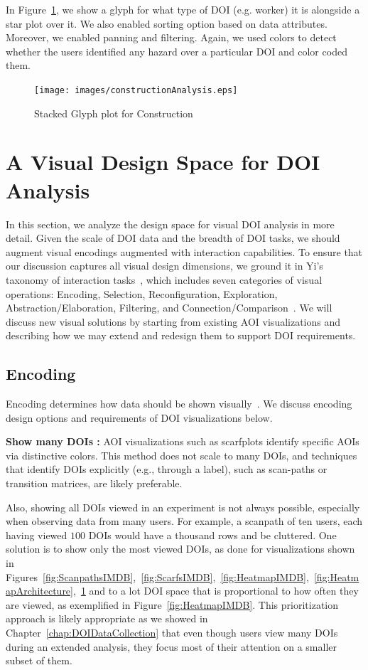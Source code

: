 In Figure~\ref{fig:constructionAnalysis}, we show a glyph for what type of DOI (e.g. worker) it is alongside a star plot over it. We also enabled sorting option based on data attributes. Moreover, we enabled panning and filtering. Again, we used colors to detect whether the users identified any hazard over a particular DOI and color coded them. 

\begin{figure}
  \centering
  \texttt{[image: images/constructionAnalysis.eps]}
  \caption{Stacked Glyph plot for Construction}
	\label{fig:constructionAnalysis}
\end{figure}

\section{A Visual Design Space for DOI Analysis}

In this section, we analyze the design space for visual DOI analysis in more detail. Given the scale of DOI data and the breadth of DOI tasks, we should augment visual encodings augmented with interaction capabilities. To ensure that our discussion captures all visual design dimensions, we ground it in Yi's taxonomy of interaction tasks~\cite{Yi07}, which includes seven categories of visual operations: Encoding, Selection, Reconfiguration, Exploration, Abstraction/Elaboration, Filtering, and Connection/Comparison~\cite{Yi07}. We will discuss new visual solutions by starting from existing AOI visualizations and describing how we may extend and redesign them to support DOI requirements. 

\subsection{Encoding}
\label{sec:Encoding}
Encoding determines how data should be shown visually~\cite{Yi07}. We discuss encoding design options and requirements of DOI visualizations below.

\textbf{Show many DOIs :} AOI visualizations such as scarfplots identify specific AOIs via distinctive colors. This method does not scale to many DOIs, and techniques that identify DOIs explicitly (e.g., through a label), such as scan-paths or transition matrices, are likely preferable. 

Also, showing all DOIs viewed in an experiment is not always possible, especially when observing data from many users. For example, a scanpath of ten users, each having viewed $100$ DOIs would have a thousand rows and be cluttered. One solution is to show only the most viewed DOIs, as done for visualizations shown in Figures~\ref{fig:ScanpathsIMDB},~\ref{fig:ScarfsIMDB},~\ref{fig:HeatmapIMDB},~\ref{fig:HeatmapArchitecture},~\ref{fig:constructionAnalysis} and to a lot DOI space that is proportional to how often they are viewed, as exemplified in Figure~\ref{fig:HeatmapIMDB}. This prioritization approach is likely appropriate as we showed in Chapter~\ref{chap:DOIDataCollection} that even though users view many DOIs during an extended analysis, they focus most of their attention on a smaller subset of them. 

